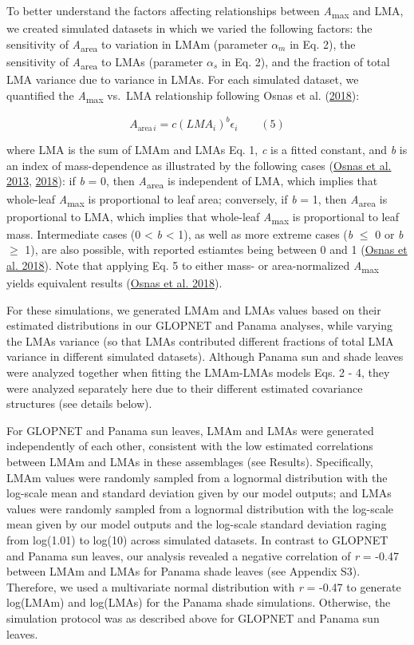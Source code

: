 \documentclass[
  12pt,
  letterpaper,
  DIV=11,
  numbers=noendperiod]{scrartcl}
\begin{document}
To better understand the factors affecting relationships between
\emph{A}\textsubscript{max} and LMA, we created simulated datasets in
which we varied the following factors: the sensitivity of
\emph{A}\textsubscript{area} to variation in LMAm (parameter
\(\alpha_m\) in Eq. 2), the sensitivity of \emph{A}\textsubscript{area}
to LMAs (parameter \(\alpha_s\) in Eq. 2), and the fraction of total LMA
variance due to variance in LMAs. For each simulated dataset, we
quantified the \emph{A}\textsubscript{max} vs.~LMA relationship
following Osnas et al. (\protect\hyperlink{ref-Osnas2018}{2018}):

\[
A_{\mathrm{area} \, i} = c (LMA_i)^{b}\epsilon_i \qquad(5)
\]

where LMA is the sum of LMAm and LMAs Eq. 1, \emph{c} is a fitted
constant, and \emph{b} is an index of mass-dependence as illustrated by
the following cases (\protect\hyperlink{ref-Osnas2013}{Osnas et al.
2013}, \protect\hyperlink{ref-Osnas2018}{2018}): if \emph{b} = 0, then
\emph{A}\textsubscript{area} is independent of LMA, which implies that
whole-leaf \emph{A}\textsubscript{max} is proportional to leaf area;
conversely, if \emph{b} = 1, then \emph{A}\textsubscript{area} is
proportional to LMA, which implies that whole-leaf
\emph{A}\textsubscript{max} is proportional to leaf mass. Intermediate
cases (0 \textless{} \emph{b} \textless{} 1), as well as more extreme
cases (\emph{b} \(\le\) 0 or \emph{b} \(\geq\) 1), are also possible,
with reported estiamtes being between 0 and 1
(\protect\hyperlink{ref-Osnas2018}{Osnas et al. 2018}). Note that
applying Eq. 5 to either mass- or area-normalized
\emph{A}\textsubscript{max} yields equivalent results
(\protect\hyperlink{ref-Osnas2018}{Osnas et al. 2018}).

For these simulations, we generated LMAm and LMAs values based on their
estimated distributions in our GLOPNET and Panama analyses, while
varying the LMAs variance (so that LMAs contributed different fractions
of total LMA variance in different simulated datasets). Although Panama
sun and shade leaves were analyzed together when fitting the LMAm-LMAs
models Eqs. 2 - 4, they were analyzed separately here due to their
different estimated covariance structures (see details below).

For GLOPNET and Panama sun leaves, LMAm and LMAs were generated
independently of each other, consistent with the low estimated
correlations between LMAm and LMAs in these assemblages (see Results).
Specifically, LMAm values were randomly sampled from a lognormal
distribution with the log-scale mean and standard deviation given by our
model outputs; and LMAs values were randomly sampled from a lognormal
distribution with the log-scale mean given by our model outputs and the
log-scale standard deviation raging from log(1.01) to log(10) across
simulated datasets. In contrast to GLOPNET and Panama sun leaves, our
analysis revealed a negative correlation of \emph{r} = -0.47 between
LMAm and LMAs for Panama shade leaves (see Appendix S3). Therefore, we
used a multivariate normal distribution with \emph{r} = -0.47 to
generate log(LMAm) and log(LMAs) for the Panama shade simulations.
Otherwise, the simulation protocol was as described above for GLOPNET
and Panama sun leaves.
\end{document}
